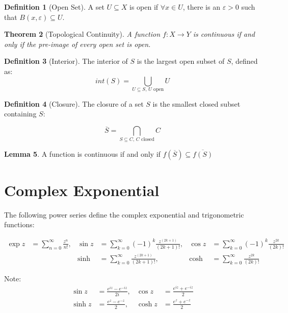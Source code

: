 \documentclass[11pt,a4paper, titlepage]{article}
\newtheorem{theorem}{Theorem}[section]
\theoremstyle{definition}
\newtheorem{definition}[theorem]{Definition}
\newtheorem{lemma}[theorem]{Lemma}
\begin{document}
\begin{definition}[Open Set]
A set $U \subseteq X$ is open if $\forall x \in U$, there is an $\varepsilon > 0$ such that $B(x, \varepsilon) \subseteq U$. 
\end{definition}

\begin{theorem}[Topological Continuity]
A function $f \colon X \longrightarrow Y$ is continuous if and only if the pre-image of every open set is open.
\end{theorem}

\begin{definition}[Interior]
The interior of $S$ is the largest open subset of $S$, defined as:
\[
	int(S) = \bigcup_{ U \subseteq S \textrm{,  } U \textrm{ open}} U
\]
\end{definition}

\begin{definition}[Closure]
The closure of a set $S$ is the smallest closed subset containing $S$:

\[
	\overline{S} = \bigcap_{S \subseteq C, \,  C\textrm{ closed}} C
\]
\end{definition}

\begin{lemma}
A function is continuous if and only if $f(\overline{S}) \subseteq \overline{f(S)}$
\end{lemma}

\section{Complex Exponential}

The following power series define the complex exponential and trigonometric functions:

\begin{align*}
	\exp z &= \sum_{n = 0}^\infty \frac{z^n}{n!}, & \sin z &= \sum_{k = 0}^\infty (-1)^k\frac{z^{(2k+1)}}{(2k + 1)!},& \cos z &= \sum_{k = 0}^\infty (-1)^k\frac{z^{2k}}{(2k)!} \\
 	&& \sinh &= \sum_{k = 0}^\infty \frac{z^{(2k+1)}}{(2k + 1)!}, &\cosh &= \sum_{k = 0}^\infty \frac{z^{2k}}{(2k)!}
\end{align*}

Note:
\begin{align*}
\sin z &= \frac{e^{iz} - e^{-iz}}{2i}, & \cos z &= \frac{e^{iz} + e^{-iz}}{2} \\
\sinh z &= \frac{e^{z} - e^{-z}}{2}, & \cosh z &= \frac{e^{z} + e^{-z}}{2}
\end{align*}
\end{document}
